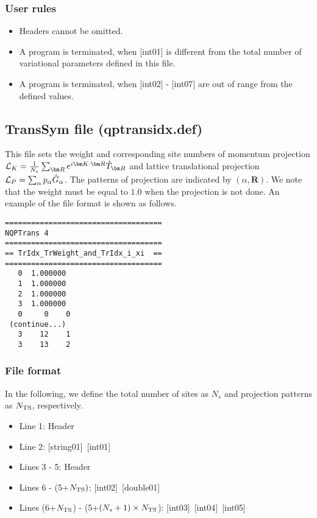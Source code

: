 \subsubsection{User rules}
\begin{itemize}
\item Headers cannot be omitted. 
\item A program is terminated, when $[$int01$]$ is different from the total number of variational parameters defined in this file.
\item A program is terminated, when $[$int02$]$ - $[$int07$]$ are out of range from the defined values.
\end{itemize}

\newpage
\subsection{TransSym file (qptransidx.def)}
\label{Subsec:TransSym}
This file sets the weight and corresponding site numbers of momentum projection
${\cal L}_K=\frac{1}{N_s}\sum_{{\bm R}}e^{i {\bm K} \cdot{\bm R} } \hat{T}_{\bm R}$
and lattice translational projection 
${\cal L}_P=\sum_{\alpha}p_{\alpha} \hat{G}_{\alpha}$. 
The patterns of projection are indicated by $(\alpha, {\bm R})$.
We note that the weight must be equal to $1.0$ when the projection is not done.
An example of the file format is shown as follows.

\begin{minipage}{12.5cm}
\begin{screen}
\begin{verbatim}
====================================
NQPTrans 4  
====================================
== TrIdx_TrWeight_and_TrIdx_i_xi  ==
====================================
   0  1.000000
   1  1.000000
   2  1.000000
   3  1.000000
   0     0    0
 (continue...)
   3    12    1
   3    13    2 
\end{verbatim}
\end{screen}
\end{minipage}

\subsubsection{File format}
In the following, we define the total number of sites as $N_s$ and projection patterns as $N_{\rm TS}$, respectively.  

 \begin{itemize}
   \item  Line 1: Header
   \item  Line 2: [string01]~[int01]
   \item  Lines 3 - 5:  Header
   \item  Lines 6 - (5+$N_{\rm TS})$: [int02]~[double01]
   \item  Lines (6+$N_{\rm TS}$) - (5+$(N_s+1) \times N_{\rm TS}$): [int03]~[int04]~[int05]
  \end{itemize}
